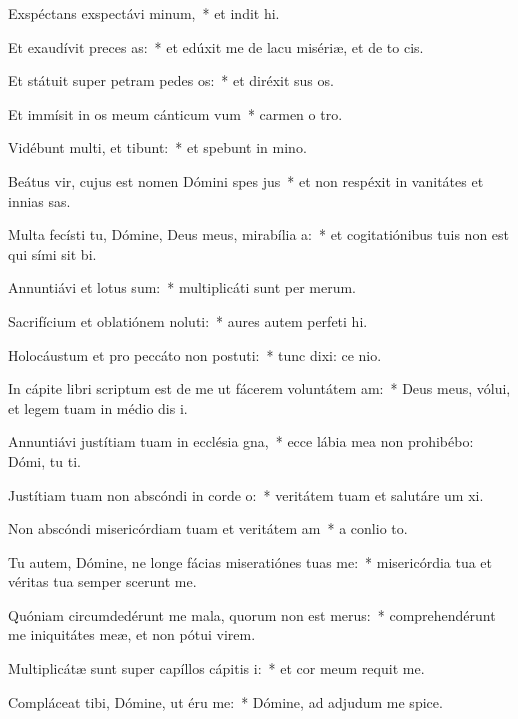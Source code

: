 \item Exspéctans exspectávi minum,~* et indit hi.
\item Et exaudívit preces as:~* et edúxit me de lacu misériæ, et de to cis.
\item Et státuit super petram pedes os:~* et diréxit sus os.
\item Et immísit in os meum cánticum vum~* carmen o tro.
\item Vidébunt multi, et tibunt:~* et spebunt in mino.
\item Beátus vir, cujus est nomen Dómini spes jus~* et non respéxit in vanitátes et innias sas.
\item Multa fecísti tu, Dómine, Deus meus, mirabília a:~* et cogitatiónibus tuis non est qui sími sit bi.
\item Annuntiávi et lotus sum:~* multiplicáti sunt per merum.
\item Sacrifícium et oblatiónem noluti:~* aures autem perfeti hi.
\item Holocáustum et pro peccáto non postuti:~* tunc dixi: ce nio.
\item In cápite libri scriptum est de me ut fácerem voluntátem am:~* Deus meus, vólui, et legem tuam in médio dis i.
\item Annuntiávi justítiam tuam in ecclésia gna,~* ecce lábia mea non prohibébo: Dómi, tu ti.
\item Justítiam tuam non abscóndi in corde o:~* veritátem tuam et salutáre um xi.
\item Non abscóndi misericórdiam tuam et veritátem am~* a conlio to.
\item Tu autem, Dómine, ne longe fácias miseratiónes tuas  me:~* misericórdia tua et véritas tua semper scerunt me.
\item Quóniam circumdedérunt me mala, quorum non est merus:~* comprehendérunt me iniquitátes meæ, et non pótui  virem.
\item Multiplicátæ sunt super capíllos cápitis i:~* et cor meum requit me.
\item Compláceat tibi, Dómine, ut éru me:~* Dómine, ad adjudum me spice.
